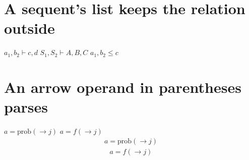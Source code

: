 \documentclass{article}
\begin{document}
\section{A sequent's list keeps the relation outside}
$a_1,b_2\vdash c,d$ $S_1,S_2\vdash A,B,C$ $a_1,b_2\leq c$

\section{An arrow operand in parentheses parses}
$a=\mathrm{prob}(\rightarrow j)$ $a=f(\rightarrow j)$
\[\begin{gathered}a=\mathrm{prob}(\rightarrow j)\end{gathered}\]
\[\begin{gathered}a=f(\rightarrow j)\end{gathered}\]
\end{document}

